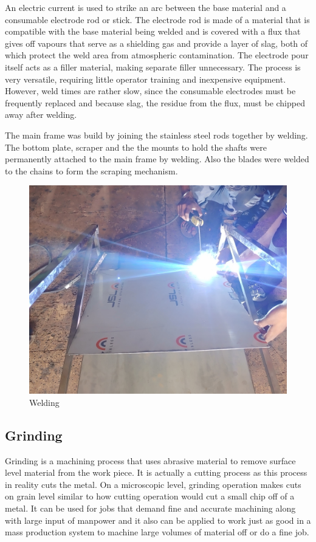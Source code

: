 An electric current is used to strike an arc between the base material and a consumable electrode rod or stick. The electrode rod is made of a material that is compatible with the base material being welded and is covered with a flux that gives off vapours that serve as a shielding gas and provide a layer of slag, both of which protect the weld area from atmospheric contamination. The electrode pour itself acts as a filler material, making separate filler unnecessary. The process is very versatile, requiring little operator training and inexpensive equipment. However, weld times are rather slow, since the consumable electrodes must be frequently replaced and because slag, the residue from the flux, must be chipped away after welding.

The main frame was build by joining the stainless steel rods together by welding. The bottom plate, scraper and the the mounts to hold the shafts were permanently attached to the main frame by welding. Also the blades were welded to the chains to form the scraping mechanism.  

\begin{figure}[H]
    \centering
    \includegraphics[scale=0.05]{welding.jpg}
    \caption{Welding}
    \label{fig:Welding}
\end{figure}

\subsection{Grinding} \label{Grinding}
Grinding is a machining process that uses abrasive material to remove surface level material from the work piece. It is actually a cutting process as this process in reality cuts the metal. On a microscopic level, grinding operation makes cuts on grain level similar to how cutting operation would cut a small chip off of a metal. It can be used for jobs that demand fine and accurate machining along with large input of manpower and it also can be applied to work just as good in a mass production system to machine large volumes of material off or do a fine job.

